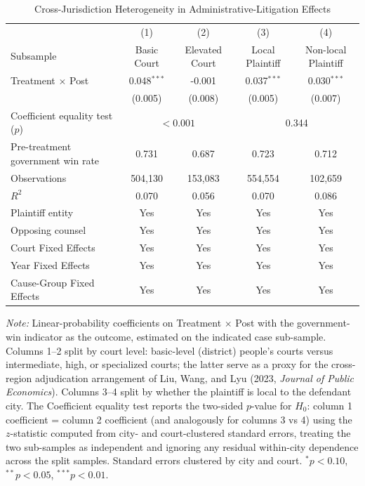 \begin{table}[!htbp]
\setlength{\abovecaptionskip}{0pt}
\centering
\caption{Cross-Jurisdiction Heterogeneity in Administrative-Litigation Effects}
\label{tab:admin_cross_jurisdiction_heterogeneity}
\begin{threeparttable}
\begin{tabular}{lcccc}
\toprule
 & (1) & (2) & (3) & (4) \\
Subsample & Basic Court & Elevated Court & Local Plaintiff & Non-local Plaintiff \\
\midrule
Treatment $\times$ Post & 0.048$^{***}$ & -0.001 & 0.037$^{***}$ & 0.030$^{***}$ \\
& (0.005) & (0.008) & (0.005) & (0.007) \\
\addlinespace
Coefficient equality test ($p$) & \multicolumn{2}{c}{$<0.001$} & \multicolumn{2}{c}{0.344} \\
\addlinespace
Pre-treatment government win rate & 0.731 & 0.687 & 0.723 & 0.712 \\
Observations & 504,130 & 153,083 & 554,554 & 102,659 \\
$R^2$ & 0.070 & 0.056 & 0.070 & 0.086 \\
Plaintiff entity & Yes & Yes & Yes & Yes \\
Opposing counsel & Yes & Yes & Yes & Yes \\
Court Fixed Effects & Yes & Yes & Yes & Yes \\
Year Fixed Effects & Yes & Yes & Yes & Yes \\
Cause-Group Fixed Effects & Yes & Yes & Yes & Yes \\
\bottomrule
\end{tabular}
\begin{tablenotes}[flushleft]
\footnotesize
\item \textit{Note:} Linear-probability coefficients on Treatment $\times$ Post with the government-win indicator as the outcome, estimated on the indicated case sub-sample. Columns 1--2 split by court level: basic-level (district) people's courts versus intermediate, high, or specialized courts; the latter serve as a proxy for the cross-region adjudication arrangement of Liu, Wang, and Lyu (2023, \textit{Journal of Public Economics}). Columns 3--4 split by whether the plaintiff is local to the defendant city. The Coefficient equality test reports the two-sided $p$-value for $H_0$: column 1 coefficient = column 2 coefficient (and analogously for columns 3 vs 4) using the $z$-statistic computed from city- and court-clustered standard errors, treating the two sub-samples as independent and ignoring any residual within-city dependence across the split samples. Standard errors clustered by city and court. $^{*}p<0.10$, $^{**}p<0.05$, $^{***}p<0.01$.
\end{tablenotes}
\end{threeparttable}
\end{table}
